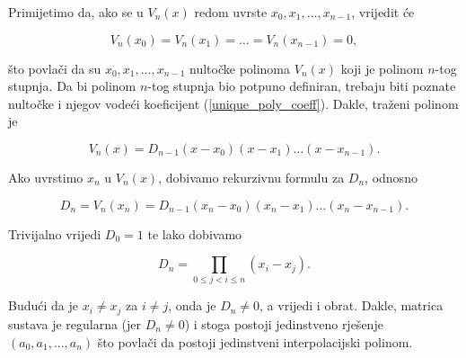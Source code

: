 Primijetimo da, ako se u $V_n(x)$ redom uvrste $x_0,x_1,\dots,x_{n-1}$, vrijedit će

$$
V_n(x_0)=V_n(x_1)=\dots=V_n(x_{n-1})=0,
$$

što povlači da su $x_0,x_1,\dots,x_{n-1}$ nultočke polinoma $V_n(x)$ koji je polinom $n$-tog stupnja.
Da bi polinom $n$-tog stupnja bio potpuno definiran, trebaju biti poznate nultočke i njegov
vodeći koeficijent (\ref{unique_poly_coeff}). Dakle, traženi polinom je

$$
V_n(x) = D_{n-1}(x-x_0)(x-x_1)\dots(x-x_{n-1}).
$$

Ako uvrstimo $x_n$ u $V_n(x)$, dobivamo rekurzivnu formulu za $D_n$, odnosno

$$
D_n=V_n(x_n)=D_{n-1}(x_n-x_0)(x_n-x_1)\dots(x_n-x_{n-1}).
$$

Trivijalno vrijedi $D_0 = 1$ te lako dobivamo

$$
D_n = \prod_{0\leq j<i\leq n}(x_i-x_j).
$$

Budući da je $x_i\neq x_j$ za $i\neq j$, onda je $D_n\neq 0$, a vrijedi i obrat.
Dakle, matrica sustava je regularna (jer $D_n\neq 0$) i stoga postoji jedinstveno rješenje
$(a_0,a_1,\dots,a_n)$ što povlači da postoji jedinstveni interpolacijski polinom.
